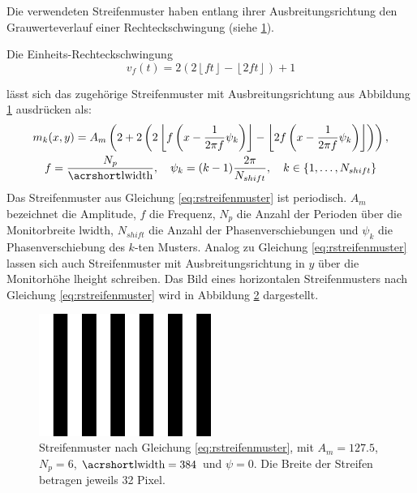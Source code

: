 Die verwendeten Streifenmuster haben entlang ihrer Ausbreitungsrichtung den Grauwerteverlauf einer Rechteckschwingung (siehe \ref{tikz:abbRechteckschwingung}).

\noindent
Die Einheits-Rechteckschwingung
\begin{equation*}
	v_f(t) = 2 \left( 2 \left\lfloor ft \right\rfloor - \left\lfloor 2ft \right\rfloor \right) + 1
\end{equation*}
%
{
	\begin{figure}[H]
		\centering
		
		\label{tikz:abbRechteckschwingung}
	\end{figure}
}
%
lässt sich das zugehörige Streifenmuster mit Ausbreitungsrichtung aus Abbildung \ref{tikz:abbRechteckschwingung} ausdrücken als:
\begin{equation} \label{eq:rstreifenmuster}
	\begin{gathered}
		m_k(x,y) = A_m 
		\left(
			2 + 2 
			\left(2 
				\left\lfloor f \left(x - \dfrac{1}{2\pi f} \psi_k \right) \right\rfloor 
				- 
				\left\lfloor 2 f \left(x - \dfrac{1}{2\pi f} \psi_k \right) \right\rfloor
			\right)
		\right),\\
		f = \dfrac{N_p}{\acrshortmath{lwidth}},
		\quad
		\psi_k = (k - 1)\dfrac{2\pi}{N_{shift}},
		\quad
		k \in \lbrace 1,\ldots,N_{shift}\rbrace 
	\end{gathered}
\end{equation}
%
Das Streifenmuster aus Gleichung \ref{eq:rstreifenmuster} ist periodisch.
$A_m$ bezeichnet die Amplitude, $f$ die Frequenz, $N_p$ die Anzahl der Perioden über die Monitorbreite \acrshort{lwidth}, $N_{shift}$ die Anzahl der Phasenverschiebungen und $\psi_k$ die Phasenverschiebung des $k$-ten Musters.
Analog zu Gleichung \ref{eq:rstreifenmuster} lassen sich auch Streifenmuster mit Ausbreitungsrichtung in $y$ über die Monitorhöhe \acrshort{lheight} schreiben.
Das Bild eines horizontalen Streifenmusters nach Gleichung \ref{eq:rstreifenmuster} wird in Abbildung \ref{img:rechteckStreifenmuster} dargestellt.
%
\begin{figure}[H]
	\centering
	\includegraphics[frame,width=0.5\textwidth]{03_sichtpruefungDurchLichtstreuung/einsatzVonMehrerenStreifenmustern/figures/rechteckStreifenmuster}
	\caption[Rechteckförmiges Streifenmuster]{Streifenmuster nach Gleichung \ref{eq:rstreifenmuster}, mit $A_m = 127.5$, $N_p = 6$, $\acrshortmath{lwidth} = 384$ und $\psi = 0$. Die Breite der Streifen betragen jeweils 32 Pixel.}
	\label{img:rechteckStreifenmuster}
\end{figure}

